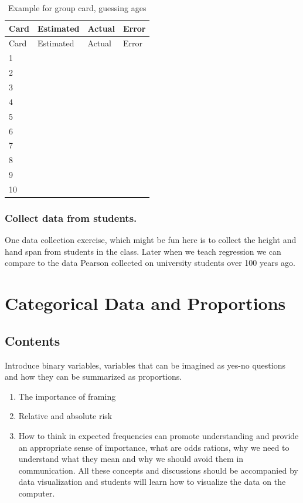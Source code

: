 \documentclass[
  letterpaper,
]{scrbook}
\providecommand{\tightlist}{%
  \setlength{\itemsep}{0pt}\setlength{\parskip}{0pt}}\usepackage{longtable,booktabs,array}
\begin{document}
\begin{longtable}[]{@{}llll@{}}
\caption{Example for group card, guessing ages}\tabularnewline
\toprule()
Card & Estimated & Actual & Error \\
\midrule()
\endfirsthead
\toprule()
Card & Estimated & Actual & Error \\
\midrule()
\endhead
1 & & & \\
2 & & & \\
3 & & & \\
4 & & & \\
5 & & & \\
6 & & & \\
7 & & & \\
8 & & & \\
9 & & & \\
10 & & & \\
\bottomrule()
\end{longtable}

\hypertarget{collect-data-from-students.}{%
\subsection{Collect data from
students.}\label{collect-data-from-students.}}

One data collection exercise, which might be fun here is to collect the
height and hand span from students in the class. Later when we teach
regression we can compare to the data Pearson collected on university
students over 100 years ago.


\hypertarget{categorical-data-and-proportions}{%
\chapter{Categorical Data and
Proportions}\label{categorical-data-and-proportions}}

\hypertarget{contents}{%
\section{Contents}\label{contents}}

Introduce binary variables, variables that can be imagined as yes-no
questions and how they can be summarized as proportions.

\begin{enumerate}
\def\labelenumi{\arabic{enumi}.}
\tightlist
\item
  The importance of framing
\item
  Relative and absolute risk
\item
  How to think in expected frequencies can promote understanding and
  provide an appropriate sense of importance, what are odds rations, why
  we need to understand what they mean and why we should avoid them in
  communication. All these concepts and discussions should be
  accompanied by data visualization and students will learn how to
  visualize the data on the computer.
\end{enumerate}
\end{document}
